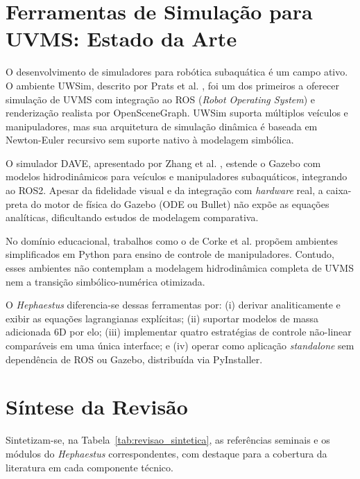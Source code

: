 \section{Ferramentas de Simulação para UVMS: Estado da Arte}

O desenvolvimento de simuladores para robótica subaquática é um campo ativo. O ambiente UWSim, descrito por Prats et al. \cite{prats2012open}, foi um dos primeiros a oferecer simulação de UVMS com integração ao ROS (\textit{Robot Operating System}) e renderização realista por OpenSceneGraph. UWSim suporta múltiplos veículos e manipuladores, mas sua arquitetura de simulação dinâmica é baseada em Newton-Euler recursivo sem suporte nativo à modelagem simbólica.

O simulador DAVE, apresentado por Zhang et al. \cite{zhang2022dave}, estende o Gazebo com modelos hidrodinâmicos para veículos e manipuladores subaquáticos, integrando ao ROS2. Apesar da fidelidade visual e da integração com \textit{hardware} real, a caixa-preta do motor de física do Gazebo (ODE ou Bullet) não expõe as equações analíticas, dificultando estudos de modelagem comparativa.

No domínio educacional, trabalhos como o de Corke et al. \cite{corke2021toolbox} propõem ambientes simplificados em Python para ensino de controle de manipuladores. Contudo, esses ambientes não contemplam a modelagem hidrodinâmica completa de UVMS nem a transição simbólico-numérica otimizada.

O \textit{Hephaestus} diferencia-se dessas ferramentas por: (i) derivar analiticamente e exibir as equações lagrangianas explícitas; (ii) suportar modelos de massa adicionada 6D por elo; (iii) implementar quatro estratégias de controle não-linear comparáveis em uma única interface; e (iv) operar como aplicação \textit{standalone} sem dependência de ROS ou Gazebo, distribuída via PyInstaller.

\section{Síntese da Revisão}

Sintetizam-se, na Tabela~\ref{tab:revisao_sintetica}, as referências seminais e os módulos do \textit{Hephaestus} correspondentes, com destaque para a cobertura da literatura em cada componente técnico.

